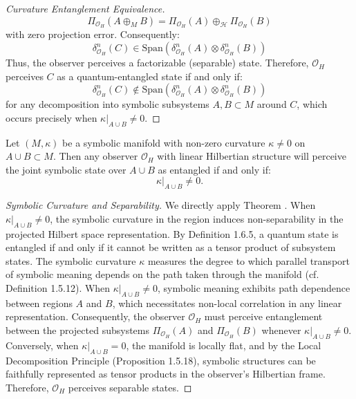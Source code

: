 \begin{proof}[Curvature Entanglement Equivalence]
\begin{equation}
\Pi_{\mathcal{O}_H}(A \oplus_M B) = \Pi_{\mathcal{O}_H}(A) \oplus_{\mathcal{H}} \Pi_{\mathcal{O}_H}(B)
\end{equation}
with zero projection error. Consequently:
\begin{equation}
\delta^n_{\mathcal{O}_H}(C) \in \text{Span}(\delta^n_{\mathcal{O}_H}(A) \otimes \delta^n_{\mathcal{O}_H}(B))
\end{equation}
Thus, the observer perceives a factorizable (separable) state.
Therefore, $\mathcal{O}_H$ perceives $C$ as a quantum-entangled state if and only if:
\begin{equation}
\delta^n_{\mathcal{O}_H}(C) \notin \text{Span}(\delta^n_{\mathcal{O}_H}(A) \otimes \delta^n_{\mathcal{O}_H}(B))
\end{equation}
for any decomposition into symbolic subsystems $A, B \subset M$ around $C$, which occurs precisely when $\kappa|_{A \cup B} \neq 0$.
\end{proof}
\begin{corollary}
\label{corollary:bk8_memory_repair_robustness}
Let $(M, \kappa)$ be a symbolic manifold with non-zero curvature $\kappa \neq 0$ on $A \cup B \subset M$. Then any observer $\mathcal{O}_H$ with linear Hilbertian structure will perceive the joint symbolic state over $A \cup B$ as entangled if and only if:
\[
\left. \kappa \right|_{A \cup B} \neq 0.
\]
\end{corollary}
\begin{proof}[Symbolic Curvature and Separability]
\label{proof:bk8_symbolic_curvature_and_separability}
We directly apply Theorem . When $\kappa|_{A \cup B} \neq 0$, the symbolic curvature in the region induces non-separability in the projected Hilbert space representation. By Definition 1.6.5, a quantum state is entangled if and only if it cannot be written as a tensor product of subsystem states. 
The symbolic curvature $\kappa$ measures the degree to which parallel transport of symbolic meaning depends on the path taken through the manifold (cf. Definition 1.5.12). When $\kappa|_{A \cup B} \neq 0$, symbolic meaning exhibits path dependence between regions $A$ and $B$, which necessitates non-local correlation in any linear representation.
Consequently, the observer $\mathcal{O}_H$ must perceive entanglement between the projected subsystems $\Pi_{\mathcal{O}_H}(A)$ and $\Pi_{\mathcal{O}_H}(B)$ whenever $\kappa|_{A \cup B} \neq 0$.
Conversely, when $\kappa|_{A \cup B} = 0$, the manifold is locally flat, and by the Local Decomposition Principle (Proposition 1.5.18), symbolic structures can be faithfully represented as tensor products in the observer's Hilbertian frame. Therefore, $\mathcal{O}_H$ perceives separable states.
\end{proof}
